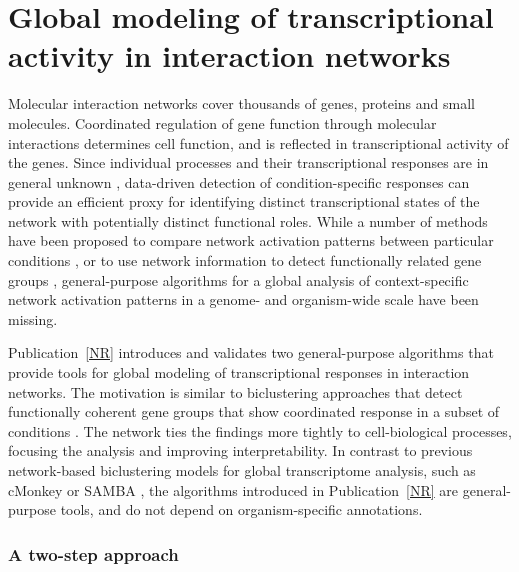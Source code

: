 \section{Global modeling of transcriptional activity in interaction
  networks}\label{sec:atlas}


Molecular interaction networks cover thousands of genes, proteins and
small molecules. Coordinated regulation of gene function through
molecular interactions determines cell function, and is reflected in
transcriptional activity of the genes.  Since individual processes and
their transcriptional responses are in general unknown \citep{Lee08c,
  Montaner09}, data-driven detection of condition-specific responses
can provide an efficient proxy for identifying distinct
transcriptional states of the network with potentially distinct
functional roles. While a number of methods have been proposed to
compare network activation patterns between particular conditions
\citep{Draghici07, Ideker02, Cabusora05, Noirel08}, or to use network
information to detect functionally related gene groups
\citep{Segal03b, Shiga07, Ulitsky07}, general-purpose algorithms for a
global analysis of context-specific network activation patterns in a
genome- and organism-wide scale have been missing.

Publication~\ref{NR} introduces and validates two general-purpose
algorithms that provide tools for global modeling of transcriptional
responses in interaction networks. The motivation is similar to
biclustering approaches that detect functionally coherent gene groups
that show coordinated response in a subset of conditions
\citep{Madeira04}. The network ties the findings more tightly to
cell-biological processes, focusing the analysis and improving
interpretability. In contrast to previous network-based biclustering
models for global transcriptome analysis, such as cMonkey
\citep{Reiss06} or SAMBA \citep{Tanay04}, the algorithms introduced in
Publication~\ref{NR} are general-purpose tools, and do not depend on
organism-specific annotations.


\subsubsection{A two-step approach}

